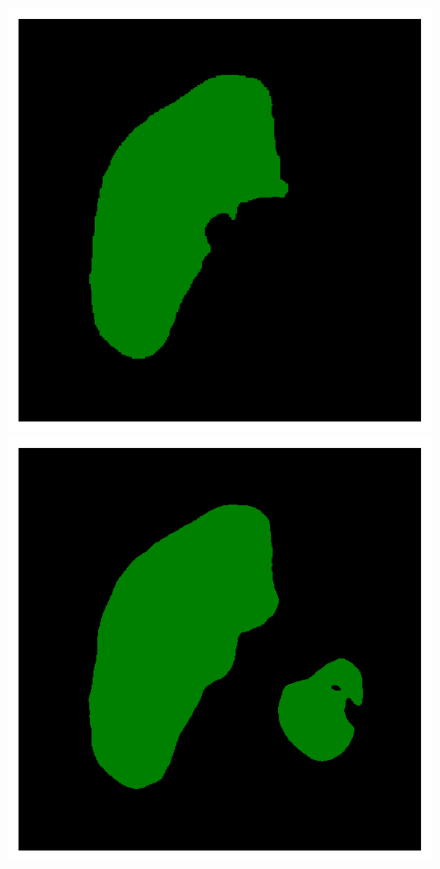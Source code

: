 \begin{figure}[!ht]
\begin{minipage}{4cm}
	\end{minipage} \hspace{-0.3cm}
	\begin{minipage}{4cm}
		\includegraphics[width=\linewidth]{images/ResizeLiverVE_GT_Pat4_5}
	\end{minipage} \hspace{-0.3cm}
	\begin{minipage}{4cm}
		\includegraphics[width=\linewidth]{images/ResizeLiverVE_Pred_Pat4_5}

\end{minipage}
\end{figure}
